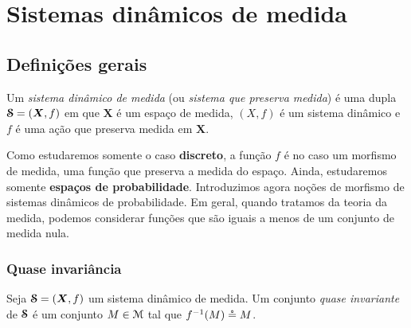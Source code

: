 \chapter{Sistemas dinâmicos de medida}

\section{Definições gerais}

\begin{definition}
Um \emph{sistema dinâmico de medida} (ou \emph{sistema que preserva medida}) é uma dupla $\bm{\mathcal{S}}=(\bm X,f)$ em que $\bm X$ é um espaço de medida, $(X,f)$ é um sistema dinâmico e $f$ é uma ação que preserva medida em $\bm X$.
\end{definition}

Como estudaremos somente o caso \textbf{discreto}, a função $f$ é no caso um morfismo de medida, uma função que preserva a medida do espaço. Ainda, estudaremos somente \textbf{espaços de probabilidade}. Introduzimos agora noções de morfismo de sistemas dinâmicos de probabilidade. Em geral, quando tratamos da teoria da medida, podemos considerar funções que são iguais a menos de um conjunto de medida nula.

\subsection{Quase invariância}

\begin{definition}
Seja $\bm{\mathcal{S}} = (\bm X,f)$ um sistema dinâmico de medida. Um conjunto \emph{quase invariante} de $\bm {\mathcal{S}}$ é um conjunto $M \in \mathcal{M}$ tal que $f^{-1}(M) \circeq M$.
\end{definition}


